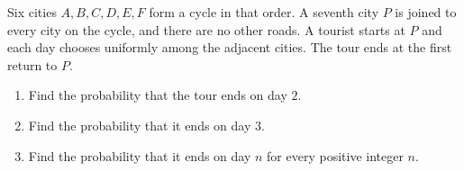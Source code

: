 Six cities $A,B,C,D,E,F$ form a cycle in that order. A seventh city $P$ is joined to every city on the cycle, and there are no other roads. A tourist starts at $P$ and each day chooses uniformly among the adjacent cities. The tour ends at the first return to $P$.
\begin{enumerate}
\item Find the probability that the tour ends on day $2$.
\item Find the probability that it ends on day $3$.
\item Find the probability that it ends on day $n$ for every positive integer $n$.
\end{enumerate}
